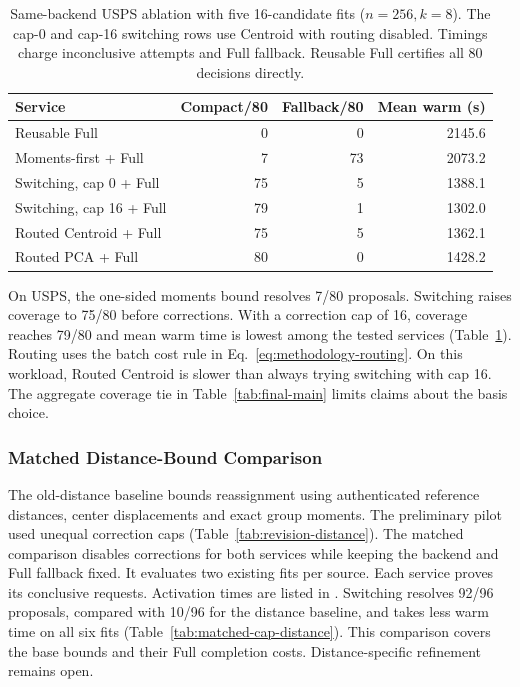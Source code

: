 \documentclass[5p,times,twocolumn]{elsarticle}
\begin{document}
\begin{table}[tbp]
\centering\small
\caption{Same-backend USPS ablation with five 16-candidate fits ($n=256,k=8$).
The cap-0 and cap-16 switching rows use Centroid with routing disabled.
Timings charge inconclusive attempts and Full fallback.
Reusable Full certifies all 80 decisions directly.}
\label{tab:final-ablation}
\begin{tabular}{@{}lrrr@{}}\toprule
Service & Compact/80 & Fallback/80 & Mean warm (s)\\
\midrule
Reusable Full & 0 & 0 & 2145.6\\
Moments-first + Full & 7 & 73 & 2073.2\\
Switching, cap 0 + Full & 75 & 5 & 1388.1\\
Switching, cap 16 + Full & 79 & 1 & 1302.0\\
Routed Centroid + Full & 75 & 5 & 1362.1\\
Routed PCA + Full & 80 & 0 & 1428.2\\
\bottomrule
\end{tabular}
\end{table}

On USPS, the one-sided moments bound resolves 7/80 proposals. Switching
raises coverage to 75/80 before corrections. With a correction cap of
16, coverage reaches 79/80 and mean warm time is lowest among the tested
services (Table~\ref{tab:final-ablation}). Routing uses the batch cost
rule in Eq.~\eqref{eq:methodology-routing}. On this workload, Routed
Centroid is slower than always trying switching with cap 16. The
aggregate coverage tie in Table~\ref{tab:final-main} limits claims about
the basis choice.

\subsubsection{Matched Distance-Bound Comparison}
The old-distance baseline bounds reassignment using authenticated
reference distances, center displacements and exact group moments.
The preliminary pilot used unequal correction caps
(Table~\ref{tab:revision-distance}). The matched comparison disables
corrections for both services while keeping the backend and Full
fallback fixed. It evaluates two existing fits per source. Each service proves its conclusive
requests. Activation times are listed in .
Switching resolves 92/96 proposals, compared with 10/96 for the distance
baseline, and takes less warm time on all six fits
(Table~\ref{tab:matched-cap-distance}). This comparison covers the base
bounds and their Full completion costs. Distance-specific refinement
remains open.
\end{document}
